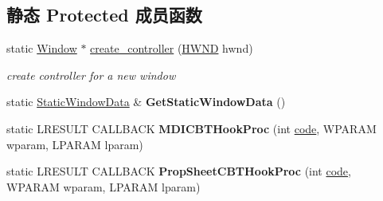 \subsection*{静态 Protected 成员函数}
\begin{DoxyCompactItemize}
\item 
\mbox{\label{struct_window_acda644b238f8c9b8e3c1c8d41c14eb21}} 
static \hyperlink{struct_window}{Window} $\ast$ \hyperlink{struct_window_acda644b238f8c9b8e3c1c8d41c14eb21}{create\+\_\+controller} (\hyperlink{interfacevoid}{H\+W\+ND} hwnd)
\begin{DoxyCompactList}\small\item\em create controller for a new window \end{DoxyCompactList}\item 
\mbox{\label{struct_window_a5b3a62eb06b694e71c017d92fbf4b9fd}} 
static \hyperlink{struct_window_1_1_static_window_data}{Static\+Window\+Data} \& {\bfseries Get\+Static\+Window\+Data} ()
\item 
\mbox{\label{struct_window_a17950a60251f661c6653f09f24fe6360}} 
static L\+R\+E\+S\+U\+LT C\+A\+L\+L\+B\+A\+CK {\bfseries M\+D\+I\+C\+B\+T\+Hook\+Proc} (int \hyperlink{structcode}{code}, W\+P\+A\+R\+AM wparam, L\+P\+A\+R\+AM lparam)
\item 
\mbox{\label{struct_window_afa0992bc47e5cf72a4bf5ceae4dca43b}} 
static L\+R\+E\+S\+U\+LT C\+A\+L\+L\+B\+A\+CK {\bfseries Prop\+Sheet\+C\+B\+T\+Hook\+Proc} (int \hyperlink{structcode}{code}, W\+P\+A\+R\+AM wparam, L\+P\+A\+R\+AM lparam)
\end{DoxyCompactItemize}
